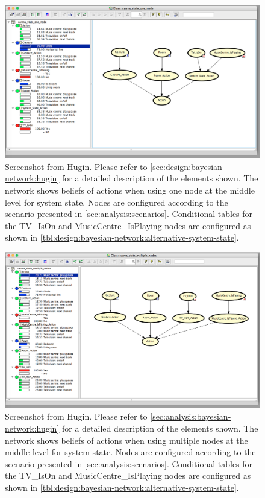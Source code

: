 \begin{figure}[h!]
\centering
\includegraphics[width=\textwidth]{images/system-state-one-6}
\caption{Screenshot from Hugin. Please refer to \cref{sec:design:bayesian-network:hugin} for a detailed description of the elements shown. The network shows beliefs of actions when using one node at the middle level for system state. Nodes are configured according to the scenario presented in \cref{sec:analysis:scenarios}. Conditional tables for the TV\_IsOn and MusicCentre\_IsPlaying nodes are configured as shown in \cref{tbl:design:bayesian-network:alternative-system-state}.}
\label{fig:design:bayesian-network:system-state-one-6}
\end{figure}

\begin{figure}[h!]
\centering
\includegraphics[width=\textwidth]{images/system-state-multiple-6}
\caption{Screenshot from Hugin. Please refer to \cref{sec:analysis:bayesian-network:hugin} for a detailed description of the elements shown. The network shows beliefs of actions when using multiple nodes at the middle level for system state. Nodes are configured according to the scenario presented in \cref{sec:analysis:scenarios}. Conditional tables for the TV\_IsOn and MusicCentre\_IsPlaying nodes are configured as shown in \cref{tbl:design:bayesian-network:alternative-system-state}.}
\label{fig:design:bayesian-network:system-state-multiple-6}
\end{figure}





